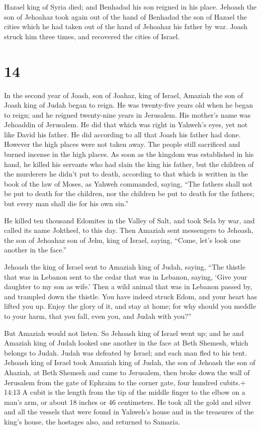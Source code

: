  Hazael king of Syria died; and Benhadad his son reigned in
his place.  Jehoash the son of Jehoahaz took again out of
the hand of Benhadad the son of Hazael the cities which he had taken out
of the hand of Jehoahaz his father by war. Joash struck him three times,
and recovered the cities of Israel.

\hypertarget{section-13}{%
\section{14}\label{section-13}}

 In the second year of Joash, son of Joahaz, king of Israel,
Amaziah the son of Joash king of Judah began to reign.  He
was twenty-five years old when he began to reign; and he reigned
twenty-nine years in Jerusalem. His mother's name was Jehoaddin of
Jerusalem.  He did that which was right in Yahweh's eyes,
yet not like David his father. He did according to all that Joash his
father had done.  However the high places were not taken
away. The people still sacrificed and burned incense in the high places.
 As soon as the kingdom was established in his hand, he
killed his servants who had slain the king his father,  but
the children of the murderers he didn't put to death, according to that
which is written in the book of the law of Moses, as Yahweh commanded,
saying, ``The fathers shall not be put to death for the children, nor
the children be put to death for the fathers; but every man shall die
for his own sin.''

 He killed ten thousand Edomites in the Valley of Salt, and
took Sela by war, and called its name Joktheel, to this day.
 Then Amaziah sent messengers to Jehoash, the son of
Jehoahaz son of Jehu, king of Israel, saying, ``Come, let's look one
another in the face.''

 Jehoash the king of Israel sent to Amaziah king of Judah,
saying, ``The thistle that was in Lebanon sent to the cedar that was in
Lebanon, saying, `Give your daughter to my son as wife.' Then a wild
animal that was in Lebanon passed by, and trampled down the thistle.
 You have indeed struck Edom, and your heart has lifted you
up. Enjoy the glory of it, and stay at home; for why should you meddle
to your harm, that you fall, even you, and Judah with you?''

 But Amaziah would not listen. So Jehoash king of Israel
went up; and he and Amaziah king of Judah looked one another in the face
at Beth Shemesh, which belongs to Judah.  Judah was
defeated by Israel; and each man fled to his tent.  Jehoash
king of Israel took Amaziah king of Judah, the son of Jehoash the son of
Ahaziah, at Beth Shemesh and came to Jerusalem, then broke down the wall
of Jerusalem from the gate of Ephraim to the corner gate, four hundred
cubits.+ 14:13 A cubit is the length from the tip of the middle finger
to the elbow on a man's arm, or about 18 inches or 46 centimeters.
 He took all the gold and silver and all the vessels that
were found in Yahweh's house and in the treasures of the king's house,
the hostages also, and returned to Samaria.

